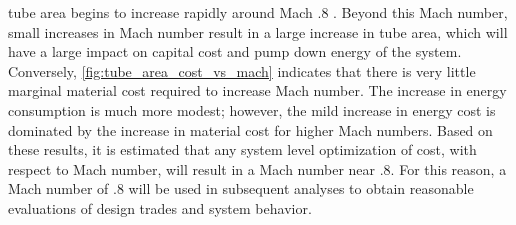 tube area begins to increase rapidly around Mach .8 \cite{Chin}.
Beyond this Mach number, small increases in Mach number result in a large
increase in tube area, which will have a large impact on capital cost and pump
down energy of the system. Conversely, \cref{fig:tube_area_cost_vs_mach}
indicates that there is very little marginal material cost required to increase
Mach number. The increase in energy consumption is much more modest; however,
the mild increase in energy cost is dominated by the increase in material cost
for higher Mach numbers. Based on these results, it is estimated that any
system level optimization of cost, with respect to Mach number, will result in a
Mach number near .8. For this reason, a Mach number of .8 will be used in
subsequent analyses to obtain reasonable evaluations of design trades and system behavior.
